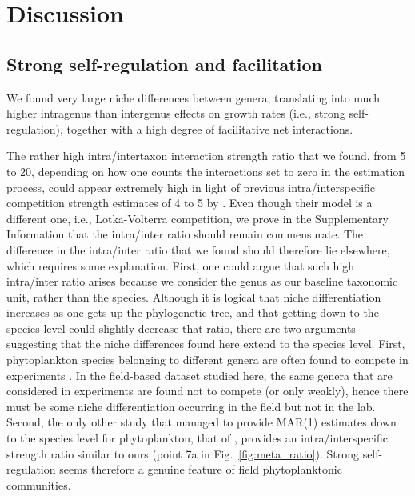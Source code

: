 \documentclass[10pt]{article}
\begin{document}
\section*{Discussion}

\subsection*{Strong self-regulation and facilitation}

We found very large niche differences between genera, translating
into much higher intragenus than intergenus effects on growth rates
(i.e., strong self-regulation), together with a high degree of facilitative
net interactions.

The rather high intra/intertaxon interaction strength ratio \citep{levine_importance_2009}
that we found, from 5 to 20, depending on how one counts the interactions
set to zero in the estimation process, could appear extremely high
in light of previous intra/interspecific competition strength estimates
of 4 to 5 by \citet{adler_competition_2018}. Even though their model
is a different one, i.e., Lotka-Volterra competition, we prove in
the Supplementary Information that the intra/inter ratio should remain
commensurate. The difference in the intra/inter ratio that we found
should therefore lie elsewhere, which requires some explanation. First,
one could argue that such high intra/inter ratio arises because we
consider the genus as our baseline taxonomic unit, rather than the
species. Although it is logical that niche differentiation increases
as one gets up the phylogenetic tree, and that getting down to the
species level could slightly decrease that ratio, there are two arguments
suggesting that the niche differences found here extend to the species
level. First, phytoplankton species belonging to different genera
are often found to compete in experiments \citep{titman_ecological_1976,tilman_phytoplankton_1982,descamps-julien_stable_2005}. In the field-based
dataset studied here, the same genera that are considered in experiments
are found not to compete (or only weakly), hence there must be some
niche differentiation occurring in the field but not in the lab. Second,
the only other study that managed to provide MAR(1) estimates down
to the species level for phytoplankton, that of \citet{huber_role_2006},
provides an intra/interspecific strength ratio similar to ours (point
7a in Fig.~\ref{fig:meta_ratio}). Strong self-regulation seems therefore
a genuine feature of field phytoplanktonic communities.
\end{document}
